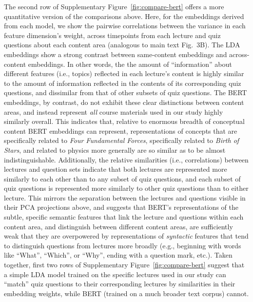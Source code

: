 \documentclass[10pt]{article}
\newcommand{\topicVariability}{3}
\begin{document}
The second row of Supplementary Figure~\ref{fig:compare-bert} offers a more 
quantitative version of the comparisons above. Here, for the embeddings derived 
from each model, we show the pairwise correlations between the variance in each 
feature dimension's weight, across timepoints from each lecture and quiz 
questions about each content area (analogous to main text 
Fig.~\topicVariability B). The LDA embeddings show a strong contrast between 
same-content embeddings and across-content embeddings. In other words, the the 
amount of ``information'' about different features (i.e., topics) reflected in 
each lecture's content is highly similar to the amount of information reflected 
in the contents of its corresponding quiz questions, and dissimilar from that of 
other subsets of quiz questions. The BERT embeddings, by contrast, do not 
exhibit these clear distinctions between content areas, and instead represent 
\textit{all} course materials used in our study highly similarly overall. This 
indicates that, relative to enormous breadth of conceptual content BERT 
embeddings can represent, representations of concepts that are specifically 
related to \textit{Four Fundamental Forces}, specifically related to 
\textit{Birth of Stars}, and related to physics more generally are so similar as 
to be almost indistinguishable. Additionally, the relative similarities (i.e., 
correlations) between lectures and question sets indicate that both lectures are 
represented more similarly to each other than to any subset of quiz questions, 
and each subset of quiz questions is represented more similarly to other quiz 
questions than to either lecture. This mirrors the separation between the 
lectures and questions visible in their PCA projections above, and suggests that 
BERT's representations of the subtle, specific semantic features that link the 
lecture and questions within each content area, and distinguish between 
different content areas, are sufficiently weak that they are overpowered by 
representations of \textit{syntactic} features that tend to distinguish 
questions from lectures more broadly (e.g., beginning with words like ``What'', 
``Which'', or ``Why'', ending with a question mark, etc.). Taken together, first 
two rows of Supplementary Figure~\ref{fig:compare-bert} suggest that a simple 
LDA model trained on the specific lectures used in our study can ``match'' quiz 
questions to their corresponding lectures by similarities in their embedding 
weights, while BERT (trained on a much broader text corpus) cannot.
\end{document}
